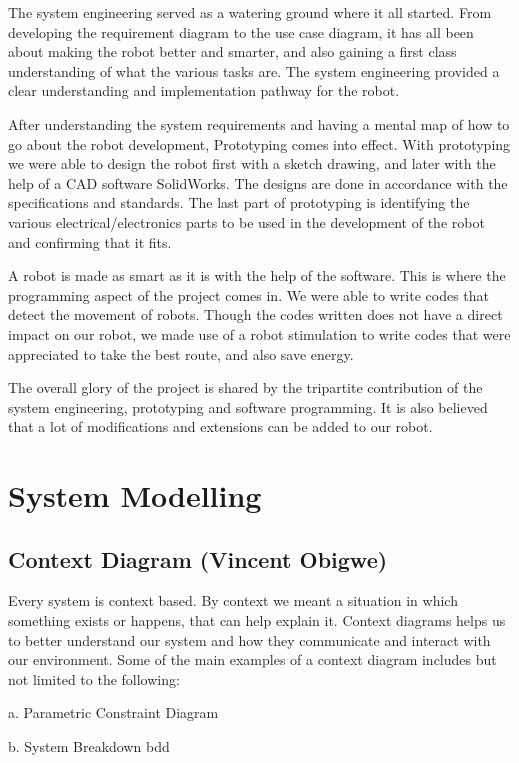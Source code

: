 \documentclass[10pt,journal,compsoc]{IEEEtran}
\begin{document}
The system engineering served as a watering ground where it all started. From developing the requirement diagram to the use case diagram, it has all been about making the robot better and smarter, and also gaining a first class understanding of what the various tasks are. The system engineering provided a clear understanding and implementation pathway for the robot.

After understanding the system requirements and having a mental map of how to go about the robot development, Prototyping comes into effect. With prototyping we were able to design the robot first with a sketch drawing, and later with the help of a CAD software SolidWorks. The designs are done in accordance with the specifications and standards. The last part of prototyping is identifying the various electrical/electronics parts to be used in the development of the robot and confirming that it fits. 

A robot is made as smart as it is with the help of the software. This is where the programming aspect of the project comes in. We were able to write codes that detect the movement of robots. Though the codes written does not have a direct impact on our robot, we made use of a robot stimulation to write codes that were appreciated to take the best route, and also save energy. 

The overall glory of the project is shared by the tripartite contribution of the system engineering, prototyping and software programming. It is also believed that a lot of modifications and extensions can be added to our robot.

\section{System Modelling}

\subsection{Context Diagram (Vincent  Obigwe)}

Every system is context based. By context we meant a situation in which something exists or happens, that can help explain it. Context diagrams helps us to better understand our system and how they communicate and interact with our environment. Some of the main examples of a context diagram includes but not limited to the following:

a. Parametric Constraint Diagram 

b. System Breakdown bdd
\end{document}
